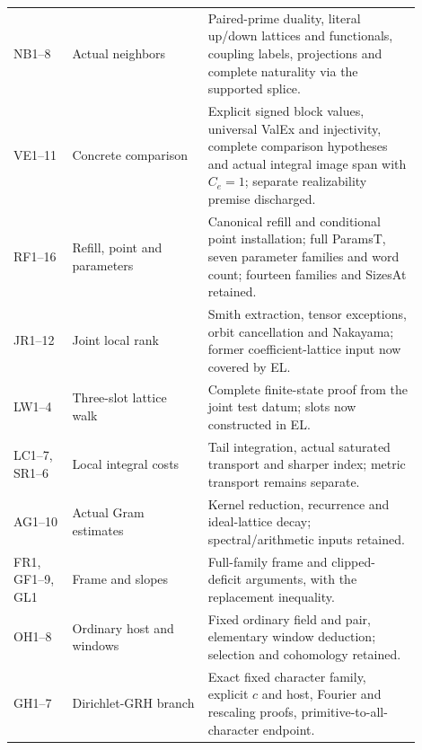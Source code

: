 \documentclass[11pt,a4paper]{article}
\numberwithin{equation}{section}
\theoremstyle{remark}\newtheorem{remark}[theorem]{Remark}
\begin{document}
\begin{longtable}{>{\raggedright\arraybackslash}p{0.13\linewidth}>{\raggedright\arraybackslash}p{0.30\linewidth}>{\raggedright\arraybackslash}p{0.47\linewidth}}
NB1--8 & Actual neighbors & Paired-prime duality, literal up/down lattices and functionals, coupling labels, projections and complete naturality via the supported splice.\\[3pt]
VE1--11 & Concrete comparison & Explicit signed block values, universal ValEx and injectivity, complete comparison hypotheses and actual integral image span with $C_e=1$; separate realizability premise discharged.\\[3pt]
RF1--16 & Refill, point and parameters & Canonical refill and conditional point installation; full ParamsT, seven parameter families and word count; fourteen families and SizesAt retained.\\[3pt]
JR1--12 & Joint local rank & Smith extraction, tensor exceptions, orbit cancellation and Nakayama; former coefficient-lattice input now covered by EL.\\[3pt]
LW1--4 & Three-slot lattice walk & Complete finite-state proof from the joint test datum; slots now constructed in EL.\\[3pt]
LC1--7, SR1--6 & Local integral costs & Tail integration, actual saturated transport and sharper index; metric transport remains separate.\\[3pt]
AG1--10 & Actual Gram estimates & Kernel reduction, recurrence and ideal-lattice decay; spectral/arithmetic inputs retained.\\[3pt]
FR1, GF1--9, GL1 & Frame and slopes & Full-family frame and clipped-deficit arguments, with the replacement inequality.\\[3pt]
OH1--8 & Ordinary host and windows & Fixed ordinary field and pair, elementary window deduction; selection and cohomology retained.\\[3pt]
GH1--7 & Dirichlet-GRH branch & Exact fixed character family, explicit $c$ and host, Fourier and rescaling proofs, primitive-to-all-character endpoint.\\
\bottomrule
\end{longtable}
\end{document}
